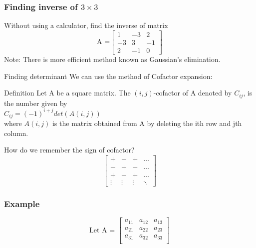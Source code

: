 \documentclass[
	11pt, %
]{beamer}
\begin{document}
\begin{frame}[t]
    \frametitle{Finding inverse of $3 \times 3$}
    Without using a calculator, find the inverse of matrix
    \[
        \text{A =}
        \begin{bmatrix}
            1 & -3 & 2\\
            -3 & 3 & -1\\
            2 & -1 & 0
        \end{bmatrix}
    \]
    Note: There is more efficient method known as Gaussian's elimination.
\end{frame}
\begin{frame}    
\end{frame}

\begin{frame}{Finding determinant}
    We can use the method of Cofactor expansion:
    \begin{block}{Definition}
        Let A be a square matrix. The \alert{$(i, j)$-cofactor} of A denoted by $C_{ij}$, is the number given by\\
        $C_{ij} = (-1)^{i+j}det(A(i,j))$\\
        where $A(i,j)$ is the matrix obtained from A by deleting the ith row and jth column.
    \end{block}
    How do we remember the sign of cofactor?\\
    \[
    \begin{bmatrix}
        + & - & + & \ldots\\
        - & + & - & \ldots\\
        + & - & + & \ldots\\
        \vdots & \vdots & \vdots & \ddots
    \end{bmatrix}
    \]
\end{frame}

\begin{frame}[t]
    \frametitle{Example}
    \[
        \text{Let A = }
        \begin{bmatrix}
            a_{11} & a_{12} & a_{13}\\
            a_{21} & a_{22} & a_{23}\\
            a_{31} & a_{32} & a_{33}\\
        \end{bmatrix}
    \]
\end{frame}
\end{document}
